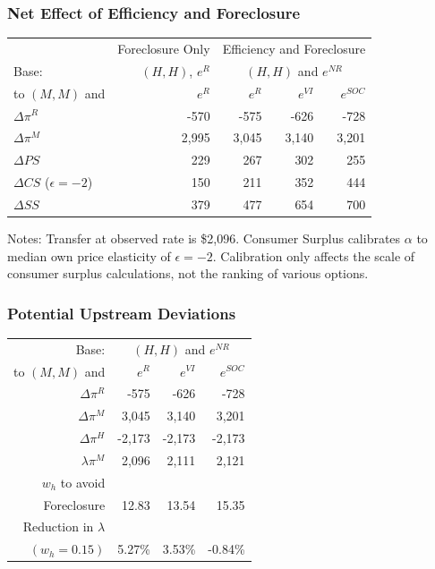 \documentclass[aspectratio=169,11pt]{beamer}
\begin{document}
\begin{frame}[label=neteffect]
\frametitle{Net Effect of Efficiency and Foreclosure}
\begin{table}[htp]
\begin{center}
\begin{tabular}{| l | r | r r r|} 
\hline
&Foreclosure Only&\multicolumn{3}{c|}{Efficiency and Foreclosure}\\
Base:  &$(H,H)$, $e^{R}$& \multicolumn{3}{c|}{ $(H,H)$ and $e^{NR}$} \\ 
to  $(M,M)$ and &$e^R$& $e^{R}$ & $e^{VI}$ & $e^{SOC}$ \\ \hline
$\Delta \pi^R$  & -570& -575 & -626 & -728 \\
$\Delta \pi^M$  & 2,995 & 3,045 & 3,140 & 3,201 \\
$\Delta PS$  & 229 & 267 & 302 & 255 \\
$\Delta CS$ ($\epsilon=-2$) & 150 & 211 & 352 & 444 \\
$\Delta SS$  & 379 & 477 & 654 & 700 \\ \hline
\end{tabular}
\end{center}
\footnotesize
\label{tab:both}
\end{table}
Notes: Transfer at observed rate is \$2,096. Consumer Surplus calibrates $\alpha$ to median own price elasticity of $\epsilon=-2$. Calibration only affects the scale of consumer surplus calculations, not the ranking of various options. 
\hyperlink{more}{}
\end{frame}

\begin{frame}[label=deviations]
\frametitle{Potential Upstream Deviations}
\footnotesize
\begin{table}[htp]
\begin{center}
\begin{tabular}{| r | r r r|} 
\hline
\multicolumn{1}{|r|}{Base: } & \multicolumn{3}{c|}{ $(H,H)$ and $e^{NR}$} \\ 
\multicolumn{1}{|r|}{to  $(M,M)$ and} & $e^{R}$ & $e^{VI}$ & $e^{SOC}$ \\ \hline
$\Delta \pi^R$ & -575 & -626 & -728 \\
$\Delta \pi^M$ & 3,045 & 3,140 & 3,201 \\
$\Delta \pi^H$ & -2,173 & -2,173 & -2,173 \\
$\lambda \pi^M$ & 2,096 & 2,111 & 2,121 \\ \hline
$w_h$ to avoid &&&\\
Foreclosure  & 12.83 & 13.54 & 15.35 \\
Reduction in $\lambda$ &&&\\
$(w_h=0.15)$  & 5.27\% & 3.53\% & -0.84\% \\ \hline
\end{tabular}
\end{center}
\label{tab:discount}
\end{table}
\hyperlink{moredeviations}{}
\end{frame}
\end{document}
